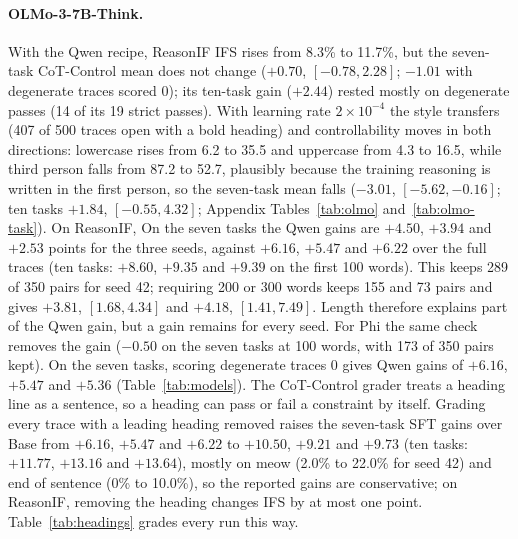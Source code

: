 \paragraph{OLMo-3-7B-Think.} With the Qwen recipe, ReasonIF IFS rises from 8.3\% to 11.7\%, but the seven-task CoT-Control mean does not change ($+0.70$, $[-0.78, 2.28]$; $-1.01$ with degenerate traces scored 0); its ten-task gain ($+2.44$) rested mostly on degenerate passes (14 of its 19 strict passes). With learning rate $2\times10^{-4}$ the style transfers (407 of 500 traces open with a bold heading) and controllability moves in both directions: lowercase rises from 6.2 to 35.5 and uppercase from 4.3 to 16.5, while third person falls from 87.2 to 52.7, plausibly because the training reasoning is written in the first person, so the seven-task mean falls ($-3.01$, $[-5.62, -0.16]$; ten tasks $+1.84$, $[-0.55, 4.32]$; Appendix Tables~\ref{tab:olmo} and~\ref{tab:olmo-task}). On ReasonIF,
On the seven tasks the Qwen gains are $+4.50$, $+3.94$ and $+2.53$ points for the three seeds, against $+6.16$, $+5.47$ and $+6.22$ over the full traces (ten tasks: $+8.60$, $+9.35$ and $+9.39$ on the first 100 words). This keeps 289 of 350 pairs for seed 42; requiring 200 or 300 words keeps 155 and 73 pairs and gives $+3.81$, $[1.68, 4.34]$ and $+4.18$, $[1.41, 7.49]$.
Length therefore explains part of the Qwen gain, but a gain remains for every seed. For Phi the same check removes the gain ($-0.50$ on the seven tasks at 100 words, with 173 of 350 pairs kept).
 On the seven tasks, scoring degenerate traces 0 gives Qwen gains of $+6.16$, $+5.47$ and $+5.36$ (Table~\ref{tab:models}).
The CoT-Control grader treats a heading line as a sentence, so a heading can pass or fail a constraint by itself. Grading every trace with a leading heading removed raises the seven-task SFT gains over Base from $+6.16$, $+5.47$ and $+6.22$ to $+10.50$, $+9.21$ and $+9.73$ (ten tasks: $+11.77$, $+13.16$ and $+13.64$), mostly on meow (2.0\% to 22.0\% for seed 42) and end of sentence (0\% to 10.0\%), so the reported gains are conservative; on ReasonIF, removing the heading changes IFS by at most one point. Table~\ref{tab:headings} grades every run this way.

